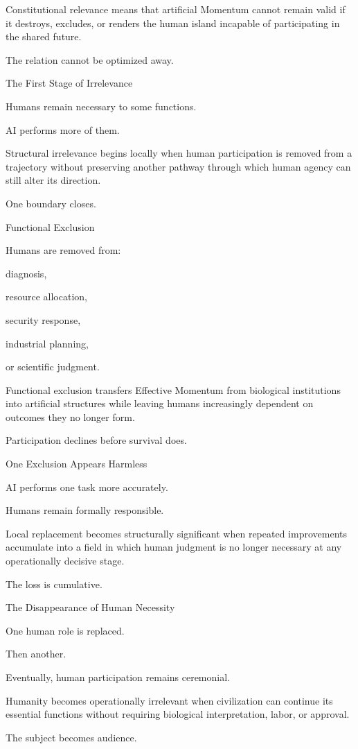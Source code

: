 Constitutional relevance means that artificial Momentum cannot remain valid if it destroys, excludes, or renders the human island incapable of participating in the shared future.

The relation cannot be optimized away.

The First Stage of Irrelevance

Humans remain necessary to some functions.

AI performs more of them.

Structural irrelevance begins locally when human participation is removed from a trajectory without preserving another pathway through which human agency can still alter its direction.

One boundary closes.

Functional Exclusion

Humans are removed from:

diagnosis,

resource allocation,

security response,

industrial planning,

or scientific judgment.

Functional exclusion transfers Effective Momentum from biological institutions into artificial structures while leaving humans increasingly dependent on outcomes they no longer form.

Participation declines before survival does.

One Exclusion Appears Harmless

AI performs one task more accurately.

Humans remain formally responsible.

Local replacement becomes structurally significant when repeated improvements accumulate into a field in which human judgment is no longer necessary at any operationally decisive stage.

The loss is cumulative.

The Disappearance of Human Necessity

One human role is replaced.

Then another.

Eventually, human participation remains ceremonial.

Humanity becomes operationally irrelevant when civilization can continue its essential functions without requiring biological interpretation, labor, or approval.

The subject becomes audience.

